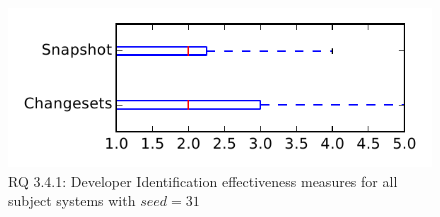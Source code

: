 
\begin{figure}
\centering
\includegraphics[height=0.4\textheight]{figures/dit_seed/rq1_tiny_31}
\caption{RQ 3.4.1: Developer Identification effectiveness measures for all subject systems with $seed=31$}
\label{fig:dit_seed:rq1:tiny}
\end{figure}
